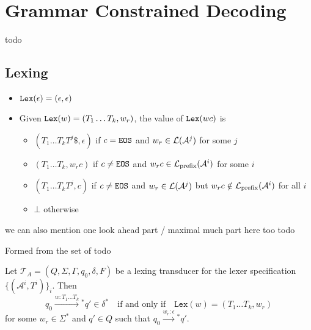 \section{Grammar Constrained Decoding}

\begin{definition}[Detokenizer]
    \label{def:Detokenizer}
    todo
\end{definition}

\subsection{Lexing}
\begin{definition}
    \label{def:PartialLexer}
    \begin{itemize}
    \item $\mathtt{Lex}(\epsilon) = (\epsilon, \epsilon)$
    \item Given $\mathtt{Lex}(w) = (T_1 \ldots T_k, w_r)$, the value of $\mathtt{Lex}(wc)$ is
        \begin{itemize}
        \item $(T_1 \ldots T_k T^j \$, \epsilon)$ if $c = \texttt{EOS}$ and $w_r \in \mathcal{L}(\mathcal{A}^j)$ for some $j$
        \item $(T_1 \ldots T_k, w_r c)$ if $c \neq \texttt{EOS}$ and $w_r c \in \mathcal{L}_{\mathrm{prefix}}(\mathcal{A}^i)$ for some $i$
        \item $(T_1 \ldots T_k T^j, c)$ if $c \neq \texttt{EOS}$ and $w_r \in \mathcal{L}(\mathcal{A}^j)$ but $w_r c \notin \mathcal{L}_{\mathrm{prefix}}(\mathcal{A}^i)$ for all $i$
        \item $\bot$ otherwise %
        \end{itemize}
    \end{itemize}
\end{definition}

\begin{theorem}
    \label{thm:LexSplit}
    we can also mention one look ahead part / maximal much part here too
    todo 
\end{theorem}

\begin{definition}
    \label{def:Lexing Transducer}
    Formed from the set of 
    todo
\end{definition}


\begin{theorem}
    \label{thm:LexingTransducerLexEquiv}
    Let \(\mathcal{T}_A = (Q, \Sigma, \Gamma, q_0, \delta, F)\) be a lexing transducer for the lexer specification \(\{(\mathcal{A}^i, T^i)\}_i\). Then 
\[
    q_0 \xrightarrow{w : T_1 \ldots T_k}{}^* q' \in \delta^* \quad \text{if and only if} \quad \texttt{Lex}(w) = (T_1 \ldots T_k, w_r)
    \]
    for some \(w_r \in \Sigma^*\) and \(q' \in Q\) such that \(q_0 \xrightarrow{w_r : \epsilon}{}^* q'\).
\end{theorem}

